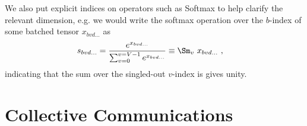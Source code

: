 \documentclass[11pt]{article}
\begin{document}
 We also put explicit indices on operators such as Softmax to help clarify the relevant
 dimension, e.g. we would write the softmax operation over the $ b $-index of some batched
 tensor $ x _{ bvd\ldots } $ as
 \begin{align}
     s _{ bvd\ldots } &= \frac{ e^{ x _{ bv d\ldots}  } }{ \sum _{ v = 0 } ^{  v= V-1 } e^{ x _{
     bvd\ldots } } } \equiv
     \Sm _{ v } \ x _{ bvd\ldots }
     \ , \label{app_eq_einstein_softmax}
 \end{align}
 indicating that the sum over the singled-out $ v $-index is gives unity.

\section{Collective Communications \label{app_collective_communications} }
\end{document}
